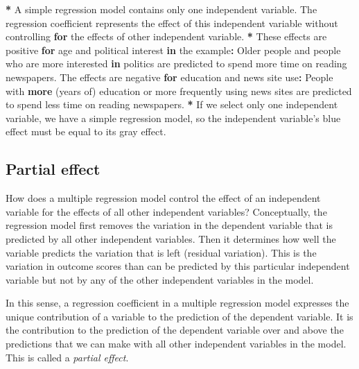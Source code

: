 \documentclass[a4paper]{book}
\newenvironment{Shaded}{\begin{snugshade}}{\end{snugshade}}
\newcommand{\KeywordTok}[1]{\textcolor[rgb]{0,0,0}{\textbf{#1}}}
\newcommand{\StringTok}[1]{\textcolor[rgb]{0.00,0.00,0.00}{#1}}
\newcommand{\ControlFlowTok}[1]{\textcolor[rgb]{0.00,0.00,0.00}{\textbf{#1}}}
\newcommand{\OperatorTok}[1]{\textcolor[rgb]{0.00,0.00,0.00}{\textbf{#1}}}
\newcommand{\NormalTok}[1]{#1}
\theoremstyle{definition}
\theoremstyle{definition}
\theoremstyle{definition}
\theoremstyle{remark}
\begin{document}
\begin{Shaded}
\begin{Highlighting}[]
\OperatorTok{*}\StringTok{ }\NormalTok{A simple regression model contains only one independent variable. The}
\NormalTok{regression coefficient represents the effect of this independent variable}
\NormalTok{without controlling }\ControlFlowTok{for}\NormalTok{ the effects of other independent variable.}
\OperatorTok{*}\StringTok{ }\NormalTok{These effects are positive }\ControlFlowTok{for}\NormalTok{ age and political interest }\ControlFlowTok{in}\NormalTok{ the example}\OperatorTok{:}
\NormalTok{Older people and people who are more interested }\ControlFlowTok{in}\NormalTok{ politics are predicted to}
\NormalTok{spend more time on reading newspapers. The effects are negative }\ControlFlowTok{for}\NormalTok{ education}
\NormalTok{and news site use}\OperatorTok{:}\StringTok{ }\NormalTok{People with }\KeywordTok{more}\NormalTok{ (years of) education or more frequently}
\NormalTok{using news sites are predicted to spend less time on reading newspapers.}
\OperatorTok{*}\StringTok{ }\NormalTok{If we select only one independent variable, we have a simple regression}
\NormalTok{model, so the independent variable}\StringTok{'s blue effect must be equal to its gray}
\StringTok{effect.}
\end{Highlighting}
\end{Shaded}

\subsection{Partial effect}\label{partial-effect}

How does a multiple regression model control the effect of an
independent variable for the effects of all other independent variables?
Conceptually, the regression model first removes the variation in the
dependent variable that is predicted by all other independent variables.
Then it determines how well the variable predicts the variation that is
left (residual variation). This is the variation in outcome scores than
can be predicted by this particular independent variable but not by any
of the other independent variables in the model.

In this sense, a regression coefficient in a multiple regression model
expresses the unique contribution of a variable to the prediction of the
dependent variable. It is the contribution to the prediction of the
dependent variable over and above the predictions that we can make with
all other independent variables in the model. This is called a
\emph{partial effect}.
\end{document}
